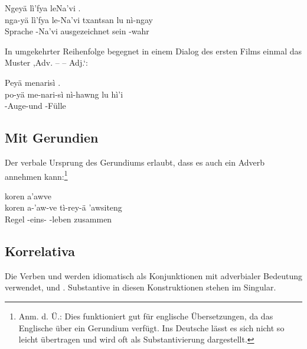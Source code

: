 \begin{interlin}
	\glll \Npawl{}Ngeyä lì'fya leNa'vi   . \\
	nga-yä lì'fya le-Na'vi txantsan lu nì-ngay \\
	 Sprache -Na'vi ausgezeichnet sein -wahr \\
\end{interlin}

\noindent In umgekehrter Reihenfolge begegnet in einem Dialog des ersten Films einmal das Muster ,Adv. --  -- Adj.‘: 

\begin{interlin}
	\glll \Nfilm{}Peyä menarisì   . \\
	po-yä me-nari-sì nì-hawng lu hì'i \\
	 -Auge-und -Fülle \\
\end{interlin}

\subsection{Mit Gerundien} Der verbale Ursprung des Gerundiums erlaubt, dass es auch ein Adverb annehmen kann:\label{syn:adverbs:gerund}\footnote{Anm. d. Ü.: Dies funktioniert gut für englische Übersetzungen, da das Englische über ein Gerundium verfügt. Ins Deutsche lässt es sich nicht so leicht übertragen und wird oft als Substantivierung dargestellt.}

\begin{interlin}
	\glll \Npawl{}koren a'awve   \\
	koren a-'aw-ve tì-rey-ä 'awsiteng \\
	Regel -eins- -leben zusammen \\
\end{interlin}

\subsection{Korrelativa} Die Verben   und   werden idiomatisch als Konjunktionen mit adverbialer Bedeutung verwendet,   und  . Substantive in diesen Konstruktionen stehen im Singular. 


